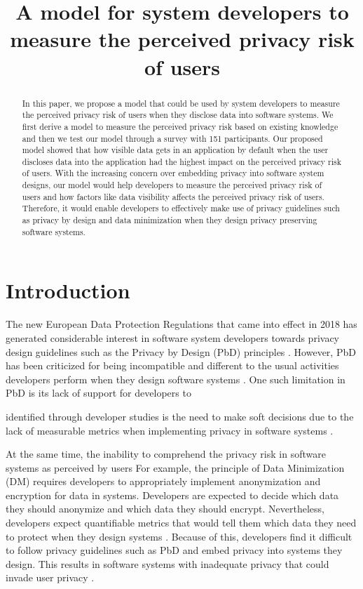 \documentclass[10pt]{article}
\title{A model for system developers to measure the perceived privacy risk of users}
\date{}
\begin{document}
\maketitle
\begin{abstract}
In this paper, we propose a model that could be used by system developers to measure the perceived privacy risk of users when they disclose data into software systems. We first derive a model to measure the perceived privacy risk based on existing knowledge and then we test our model through a survey with 151 participants. Our proposed model showed that how visible data gets in an application by default when the user discloses data into the application had the highest impact on the perceived privacy risk of users.  With the increasing concern over embedding privacy into software system designs, our model would help developers to measure the perceived privacy risk of users and how factors like data visibility affects the perceived privacy risk of users. Therefore, it would enable developers to effectively make use of privacy guidelines such as privacy by design and data minimization when they design privacy preserving software systems.

\end{abstract}



\section{Introduction}
The new European Data Protection Regulations that came into effect in 2018 has generated considerable interest in software system developers towards privacy design guidelines such as the Privacy by Design (PbD) principles \cite {wagner2016national}. However, PbD has been criticized for being incompatible and different to the usual activities developers perform when they design software systems \cite {senarath2017designing}. One such limitation in PbD is its lack of support for developers to 



 identified through developer studies is the need to make soft decisions due to the lack of measurable metrics when implementing privacy in software systems \cite {senarath2018why}. 




At the same time, the inability to comprehend the privacy risk in software systems as perceived by users For example, the principle of Data Minimization (DM) requires developers to appropriately implement anonymization and encryption for data in systems. Developers are expected to decide which data they should anonymize and which data they should encrypt. Nevertheless, developers expect quantifiable metrics that would tell them which data they need to protect when they design systems \cite {senarath2018why}. Because of this, developers find it difficult to follow privacy guidelines such as PbD and embed privacy into systems they design. This results in software systems with inadequate privacy that could invade user privacy \cite {senarath2017designing}.
\end{document}
